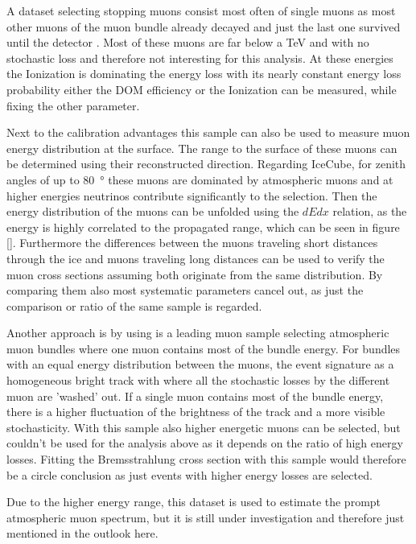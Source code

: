 A dataset selecting stopping muons consist most often of single muons as most other muons of the muon bundle already decayed and just the last one survived until the detector \cite{}.
Most of these muons are far below a TeV and with no stochastic loss and therefore not interesting for this analysis.
At these energies the Ionization is dominating the energy loss with its nearly constant energy loss probability either the DOM efficiency or the Ionization can be measured, while fixing the other parameter.

Next to the calibration advantages this sample can also be used to measure muon energy distribution at the surface.
The range to the surface of these muons can be determined using their reconstructed direction.
Regarding IceCube, for zenith angles of up to \SI{80}{\degree} these muons are dominated by atmospheric muons and at higher energies neutrinos contribute significantly to the selection.
Then the energy distribution of the muons can be unfolded using the $dEdx$ relation, as the energy is highly correlated to the propagated range, which can be seen in figure \ref{}.
Furthermore the differences between the muons traveling short distances through the ice and muons traveling long distances can be used to verify the muon cross sections assuming both originate from the same distribution.
By comparing them also most systematic parameters cancel out, as just the comparison or ratio of the same sample is regarded.

Another approach is by using is a leading muon sample selecting atmospheric muon bundles where one muon contains most of the bundle energy.
For bundles with an equal energy distribution between the muons, the event signature as a homogeneous bright track with where all the stochastic losses by the different muon are 'washed' out.
If a single muon contains most of the bundle energy, there is a higher fluctuation of the brightness of the track and a more visible stochasticity.
With this sample also higher energetic muons can be selected, but couldn't be used for the analysis above as it depends on the ratio of high energy losses.
Fitting the Bremsstrahlung cross section with this sample would therefore be a circle conclusion as just events with higher energy losses are selected.

Due to the higher energy range, this dataset is used to estimate the prompt atmospheric muon spectrum, but it is still under investigation and therefore just mentioned in the outlook here.


